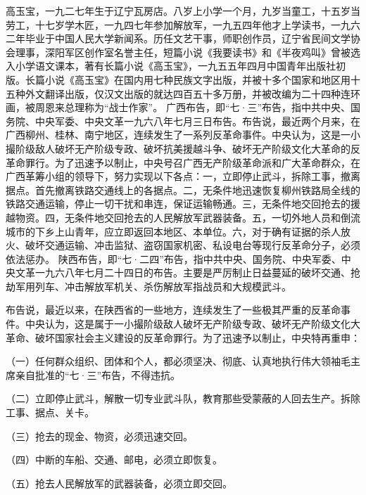\begin{maonote}
高玉宝，一九二七年生于辽宁瓦房店。八岁上小学一个月，九岁当童工，十五岁当劳工，十七岁学木匠，一九四七年参加解放军，一九五四年他才上学读书，一九六二年毕业于中国人民大学新闻系。历任文艺干事，师职创作员，辽宁省民间文学协会理事，深阳军区创作室名誉主任，短篇小说《我要读书》和《半夜鸡叫》曾被选入小学语文课本，著有长篇小说《高玉宝》，一九五五年四月中国青年出版社初版。长篇小说《高玉宝》在国内用七种民族文字出版，并被十多个国家和地区用十五种外文翻译出版，仅汉文出版的就达四百五十多万册，并被改编为二十四种连环画，被周恩来总理称为“战士作家”。
广西布告，即“七·三”布告，指中共中央、国务院、中央军委、中央文革一九六八年七月三日布告。布告说，最近两个月来，在广西柳州、桂林、南宁地区，连续发生了一系列反革命事件。中央认为，这是一小撮阶级敌人破坏无产阶级专政、破坏抗美援越斗争、破坏无产阶级文化大革命的反革命罪行。为了迅速予以制止，中央号召广西无产阶级革命派和广大革命群众，在广西革筹小组的领导下，努力实现以下各点：一，立即停止武斗，拆除工事，撤离据点。首先撤离铁路交通线上的各据点。二，无条件地迅速恢复柳州铁路局全线的铁路交通运输，停止一切干扰和串连，保证运输畅通。三，无条件地交回抢去的援越物资。四，无条件地交回抢去的人民解放军武器装备。五，一切外地人员和倒流城市的下乡上山青年，应立即返回本地区、本单位。六，对于确有证据的杀人放火、破坏交通运输、冲击监狱、盗窃国家机密、私设电台等现行反革命分子，必须依法惩办。
陕西布告，即“七·二四”布告，指中共中央、国务院、中央军委、中央文革一九六八年七月二十四日的布告。主要是严厉制止日益蔓延的破坏交通、抢劫军用列车、冲击解放军机关、杀伤解放军指战员和大规模武斗。

布告说，最近以来，在陕西省的一些地方，连续发生了一些极其严重的反革命事件。中央认为，这是属于一小撮阶级敌人破坏无产阶级专政、破坏无产阶级文化大革命、破坏国家社会主义建设的反革命罪行。为了迅速予以制止，中央特再重申：

（一）任何群众组织、团体和个人，都必须坚决、彻底、认真地执行伟大领袖毛主席亲自批准的“七·三”布告，不得违抗。

（二）立即停止武斗，解散一切专业武斗队，教育那些受蒙蔽的人回去生产。拆除工事、据点、关卡。

（三）抢去的现金、物资，必须迅速交回。

（四）中断的车船、交通、邮电，必须立即恢复。

（五）抢去人民解放军的武器装备，必须立即交回。


\end{maonote}
